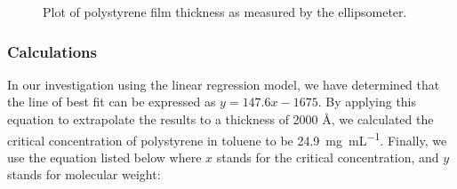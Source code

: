 \documentclass[twocolumn]{article}
\begin{document}
                \begin{figure}
                    \centering
                    \caption{Plot of polystyrene film thickness as measured by the ellipsometer.}\label{fig:ellips}
                \end{figure}

                \subsubsection{Calculations}

                In our investigation using the linear regression model, we have determined that the line of best fit can be expressed as $y = 147.6x - 1675$. By applying this equation to extrapolate the results to a thickness of 2000 \unit{\angstrom}, we calculated the critical concentration of polystyrene in toluene to be \qty{24.9}{\milli\gram\per\milli\liter}. Finally, we use the equation listed below where $x$ stands for the critical concentration, and $y$ stands for molecular weight\autocite{WOS:Sood}:
\end{document}
